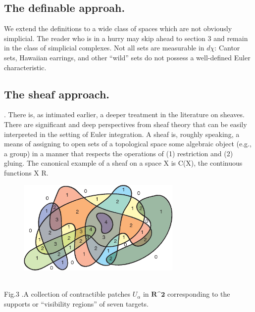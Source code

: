 \documentclass{article}
\begin{document}
\begin{flushleft}
\subsection{The definable approah.}
 
We extend the definitions to a wide class of spaces which are not obviously simplicial. The reader who is in a hurry may skip ahead to section 3 and remain in the class of simplicial complexes. Not all sets are measurable in $d\chi$: Cantor sets, Hawaiian  earrings, and  other “wild” sets do not  possess  a  well-defined  Euler  characteristic. 

\subsection{The sheaf approach.}
. There is, as intimated earlier, a deeper treatment
in the literature on sheaves. There are significant and deep perspectives from sheaf
theory that can be easily interpreted in the setting of Euler integration.
A sheaf is, roughly speaking, a means of assigning to open sets of a topological
space some algebraic object (e.g., a group) in a manner that respects the operations of
(1) restriction and (2) gluing. The canonical example of a sheaf on a space X is C(X),
the continuous functions X \rightarrow R.

\begin{figure}[h]
    \centering
    \includegraphics[width=300]{graphics/fig4.png}
\end{figure}
\\
Fig.3 .A collection of contractible patches $U_\alpha$ in  $\textbf{R^2}$ corresponding to the supports or “visibility regions” of seven targets.
\end{flushleft}
\\
\end{document}
